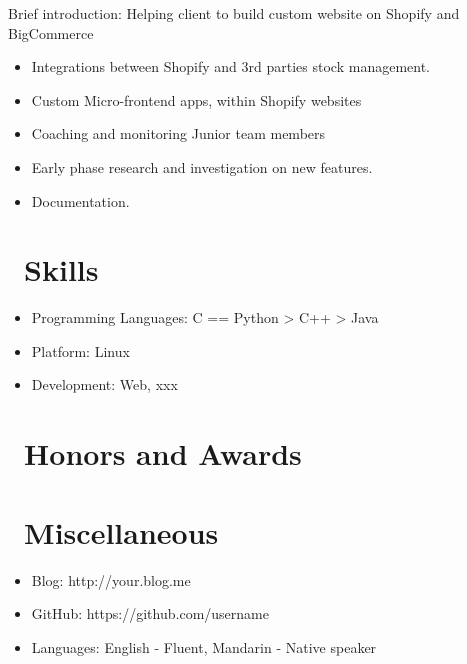 \documentclass{resume}
\begin{document}
Brief introduction: Helping client to build custom website on Shopify and BigCommerce
\begin{itemize}
  \item Integrations between Shopify and 3rd parties stock management.
  \item Custom Micro-frontend apps, within Shopify websites
  \item Coaching and monitoring Junior team members
  \item Early phase research and investigation on new features.
  \item Documentation.
\end{itemize}


\section{\faCogs\ Skills}
\begin{itemize}[parsep=0.5ex]
  \item Programming Languages: C == Python > C++ > Java
  \item Platform: Linux
  \item Development: Web, xxx
\end{itemize}

\section{\faHeartO\ Honors and Awards}

\section{\faInfo\ Miscellaneous}
\begin{itemize}[parsep=0.5ex]
  \item Blog: http://your.blog.me
  \item GitHub: https://github.com/username
  \item Languages: English - Fluent, Mandarin - Native speaker
\end{itemize}

%
%
\end{document}
